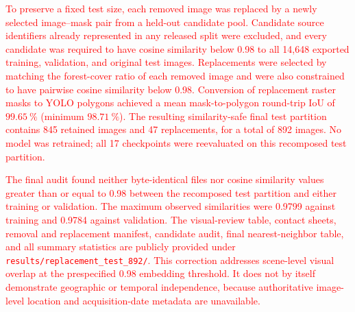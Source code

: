 \documentclass[journal,article,submit,pdftex,moreauthors]{Definitions/mdpi}
\begin{document}
\textcolor{red}{To preserve a fixed test size, each removed image was replaced by a newly selected image--mask pair from a held-out candidate pool. Candidate source identifiers already represented in any released split were excluded, and every candidate was required to have cosine similarity below 0.98 to all 14,648 exported training, validation, and original test images. Replacements were selected by matching the forest-cover ratio of each removed image and were also constrained to have pairwise cosine similarity below 0.98. Conversion of replacement raster masks to YOLO polygons achieved a mean mask-to-polygon round-trip IoU of $99.65~\%$ (minimum $98.71~\%$). The resulting similarity-safe final test partition contains 845 retained images and 47 replacements, for a total of 892 images. No model was retrained; all 17 checkpoints were reevaluated on this recomposed test partition.}

\begin{table}[ht]
\color{red}
\centering
\caption{Post-recomposition audit of the 892-image similarity-safe final test partition.}
\label{tab:split_similarity}
\end{table}

\textcolor{red}{The final audit found neither byte-identical files nor cosine similarity values greater than or equal to 0.98 between the recomposed test partition and either training or validation. The maximum observed similarities were 0.9799 against training and 0.9784 against validation. The visual-review table, contact sheets, removal and replacement manifest, candidate audit, final nearest-neighbor table, and all summary statistics are publicly provided under \texttt{results/replacement\_test\_892/}. This correction addresses scene-level visual overlap at the prespecified 0.98 embedding threshold. It does not by itself demonstrate geographic or temporal independence, because authoritative image-level location and acquisition-date metadata are unavailable.}
\end{document}
